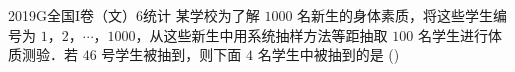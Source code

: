 
\begin{problem}{2019}{G}{全国I卷（文）}{6}{统计}
某学校为了解 $1000$ 名新生的身体素质，将这些学生编号为 $1$，$2$，$\cdots$，$1000$，从这些新生中用系统抽样方法等距抽取 $100$ 名学生进行体质测验．若 $46$ 号学生被抽到，则下面 $4$ 名学生中被抽到的是 (\hspace{1cm})
\begin{choices}
\end{choices}
\end{problem}

\begin{answer}

\end{answer}

\begin{solutions}

\end{solutions}